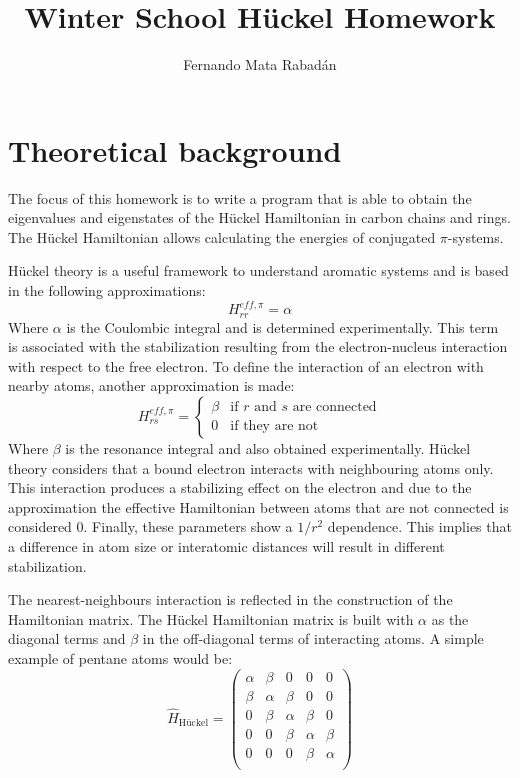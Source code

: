 \documentclass[twocolumn]{article}
\title{Winter School Hückel Homework}
\author{Fernando Mata Rabadán}
\date{}
\begin{document}
\maketitle


\section{Theoretical background}
The focus of this homework is to write a program that is able to obtain the eigenvalues and eigenstates of the Hückel Hamiltonian in carbon chains and rings. The Hückel Hamiltonian allows calculating the energies of conjugated $\pi$-systems. 

Hückel theory is a useful framework to understand aromatic systems and is based in the following approximations:
\begin{equation}
    H_{rr}^{eff, \pi} = \alpha
\end{equation}
Where $\alpha$ is the Coulombic integral and is determined experimentally.\cite{bishop1993group} This term is associated with the stabilization resulting from the electron-nucleus interaction with respect to the free electron. To define the interaction of an electron with nearby atoms, another approximation is made: 
\begin{equation}
    H_{rs}^{eff, \pi} =
\begin{cases} 
\beta & \text{if $r$ and $s$ are connected} \\
0 & \text{if they are not}
\end{cases}
\end{equation}
Where $\beta$ is the resonance integral and also obtained experimentally.\cite{bishop1993group} Hückel theory considers that a bound electron interacts with neighbouring atoms only. This interaction produces a stabilizing effect on the electron and due to the approximation the effective Hamiltonian between atoms that are not connected is considered $0$. Finally, these parameters show a \(1/r^2\) dependence. This implies that a difference in atom size or interatomic distances will result in different stabilization. 

The nearest-neighbours interaction is reflected in the  construction of the Hamiltonian matrix. The Hückel Hamiltonian matrix is built with $\alpha$ as the diagonal terms and $\beta$ in the off-diagonal terms of interacting atoms. A simple example of pentane atoms would be: 
\begin{equation}
    \hat{H}_{\textrm{Hückel}}  =
    \begin{pmatrix}
        \alpha & \beta & 0 & 0 & 0 \\
        \beta & \alpha & \beta & 0 & 0 \\
        0 & \beta & \alpha & \beta & 0 \\
        0 & 0 & \beta & \alpha & \beta \\
        0 & 0 & 0 & \beta & \alpha \\
    \end{pmatrix}
\end{equation}
    
\end{document}
